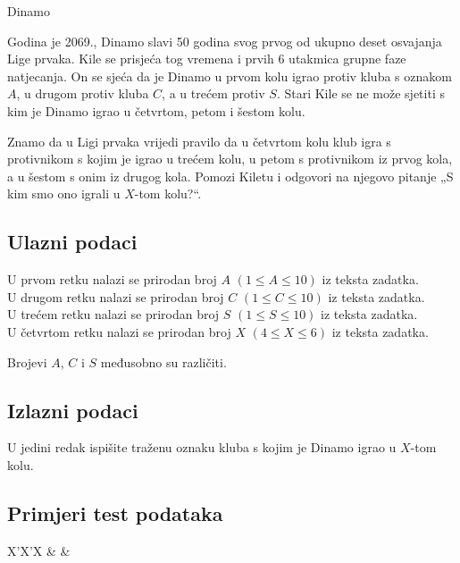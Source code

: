 \begin{statement}[
  problempoints=20,
  timelimit=1 sekunda,
  memorylimit=512 MiB,
]{Dinamo}

Godina je 2069., Dinamo slavi 50 godina svog prvog od ukupno deset osvajanja
Lige prvaka. Kile se prisjeća tog vremena i prvih 6 utakmica grupne faze
natjecanja. On se sjeća da je Dinamo u prvom kolu igrao protiv kluba s oznakom
$A$, u drugom protiv kluba $C$, a u trećem protiv $S$. Stari Kile se ne može
sjetiti s kim je Dinamo igrao u četvrtom, petom i šestom kolu.

Znamo da u Ligi prvaka vrijedi pravilo da u četvrtom kolu klub igra s
protivnikom s kojim je igrao u trećem kolu, u petom s protivnikom iz prvog kola,
a u šestom s onim iz drugog kola. Pomozi Kiletu i odgovori na njegovo pitanje
„S kim smo ono igrali u $X$-tom kolu?“.

\subsection*{Ulazni podaci}
U prvom retku nalazi se prirodan broj $A$ $(1 \le A \le 10)$ iz teksta zadatka. \\
U drugom retku nalazi se prirodan broj $C$ $(1 \le C \le 10)$ iz teksta zadatka. \\
U trećem retku nalazi se prirodan broj $S$ $(1 \le S \le 10)$ iz teksta zadatka. \\
U četvrtom retku nalazi se prirodan broj $X$ $(4 \le X \le 6)$ iz teksta zadatka.

Brojevi $A$, $C$ i $S$ međusobno su različiti.

\subsection*{Izlazni podaci}
U jedini redak ispišite traženu oznaku kluba s kojim je Dinamo igrao u $X$-tom
kolu.


\subsection*{Primjeri test podataka}
\begin{tabularx}{\textwidth}{X'X'X}
 &
 &
\end{tabularx}


\end{statement}
